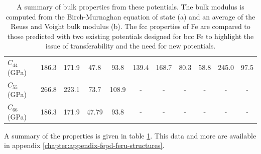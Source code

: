 \begin{table}[ht]
{\begin{tabular}{lcccccccccc}
$C_{44}$ (GPa)  &  186.3  &  171.9  &  47.8   &  93.8   &  139.4  &  168.7  &  80.3   &  58.8   &  245.0  &  97.5  \\
$C_{55}$ (GPa)  &  266.8  &  223.1  &  73.7   &  108.9  &  -      &  -      &  -      &  -      &  -      &  -     \\
$C_{66}$ (GPa)  &  186.3  &  171.9  &  47.79  &  93.8   &  -      &  -      &  -      &  -      &  -      &  -     \\
\hline\hline
\end{tabular}%
}
\caption{A summary of bulk properties from these potentials.  The bulk modulus is computed from the Birch-Murnaghan equation of state (a) and an average of the Reuss and Voight bulk modulus (b).  The \acrshort{fcc} properties of \Gls{Fe} are compared to those predicted with two existing potentials designed for \acrshort{bcc} \Gls{Fe} to highlight the issue of transferability and the need for new potentials.}
\label{table:fefccresults}
\end{table}

A summary of the properties is given in table \ref{table:fefccresults}.  This data and more are available in appendix \ref{chapter:appendix-fepd-feru-structures}.





